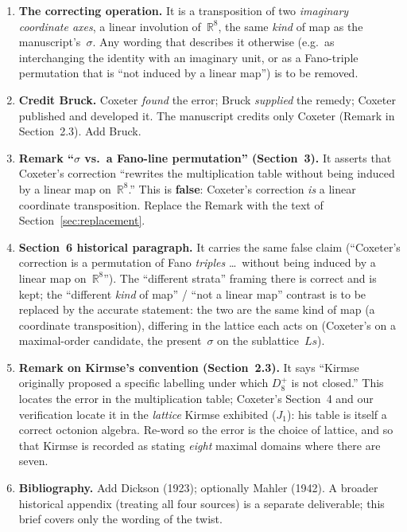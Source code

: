 \documentclass[11pt]{amsart}
\newcommand{\RR}{\mathbb{R}}
\begin{document}
\begin{enumerate}
\item[(a)] \textbf{The correcting operation.}  It is a transposition of two
  \emph{imaginary coordinate axes}, a linear involution of~$\RR^8$, the
  same \emph{kind} of map as the manuscript's~$\sigma$.  Any wording that
  describes it otherwise (e.g.\ as interchanging the identity with an
  imaginary unit, or as a Fano-triple permutation that is ``not induced by a
  linear map'') is to be removed.

\item[(b)] \textbf{Credit Bruck.}  Coxeter \emph{found} the error; Bruck
  \emph{supplied} the remedy; Coxeter published and developed it.  The
  manuscript credits only Coxeter (Remark in Section~2.3).  Add Bruck.

\item[(c)] \textbf{Remark ``$\sigma$ vs.\ a Fano-line permutation''
  (Section~3).}  It asserts that Coxeter's correction ``rewrites the
  multiplication table without being induced by a linear map on~$\RR^8$.''
  This is \textbf{false}: Coxeter's correction \emph{is} a linear coordinate
  transposition.  Replace the Remark with the text of
  Section~\ref{sec:replacement}.

\item[(d)] \textbf{Section~6 historical paragraph.}  It carries the same
  false claim (``Coxeter's correction is a permutation of Fano \emph{triples}
  \ldots\ without being induced by a linear map on~$\RR^8$'').  The
  ``different strata'' framing there is correct and is kept; the
  ``different \emph{kind} of map'' / ``not a linear map'' contrast is to be
  replaced by the accurate statement: the two are the same kind of map (a
  coordinate transposition), differing in the lattice each acts on
  (Coxeter's on a maximal-order candidate, the present~$\sigma$ on the
  sublattice~$Ls$).

\item[(e)] \textbf{Remark on Kirmse's convention (Section~2.3).}  It says
  ``Kirmse originally proposed a specific labelling under which $D_8^+$ is
  not closed.''  This locates the error in the multiplication table;
  Coxeter's Section~4 and our verification locate it in the
  \emph{lattice} Kirmse exhibited ($J_1$): his table is itself a correct
  octonion algebra.  Re-word so the error is the choice of lattice, and so
  that Kirmse is recorded as stating \emph{eight} maximal domains where
  there are seven.

\item[(f)] \textbf{Bibliography.}  Add Dickson (1923); optionally Mahler
  (1942).  A broader historical appendix (treating all four sources) is a
  separate deliverable; this brief covers only the wording of the twist.
\end{enumerate}
\end{document}
